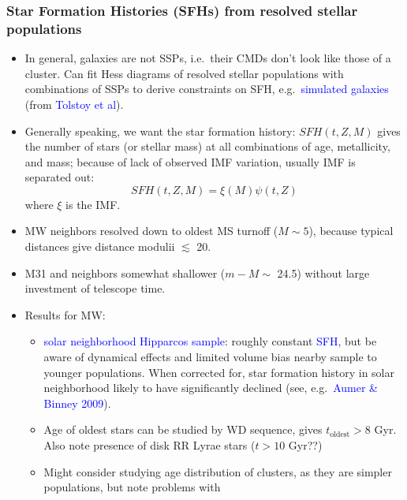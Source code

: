 \documentclass{article}
\begin{document}
\subsubsection{Star Formation Histories (SFHs) from resolved stellar populations}
      \begin{itemize}
          \item In general, galaxies are not SSPs, i.e.\ their CMDs don't look
              like those of a cluster. Can fit Hess diagrams of resolved stellar
              populations with combinations of SSPs to derive constraints on SFH,
              e.g.\ \textcolor{blue}{simulated galaxies} (from \textcolor{blue}
              {Tolstoy et al}).
          \item Generally speaking, we want the star formation history:
              $SFH(t,Z,M)$ gives the number of stars (or stellar mass) at all
              combinations of age, metallicity, and mass; because of lack of
              observed IMF variation, usually IMF is separated out:
              $$ SFH(t,Z,M) = \xi(M)\psi(t,Z) $$
              where $\xi$ is the IMF.
          \item MW neighbors resolved down to oldest MS turnoff ($M \sim 5$),
              because typical distances give distance modulii $\lesssim$ 20.
          \item M31 and neighbors somewhat shallower ($m-M\sim$ 24.5)
              without large investment of telescope time.
          \item Results for MW:
              \begin{itemize}
                  \item \textcolor{blue}{solar neighborhood Hipparcos sample}:
                      roughly constant \textcolor{blue}{SFH}, but be aware
                      of dynamical effects and limited volume bias nearby
                      sample to younger populations. When corrected for, star
                      formation history in solar neighborhood likely to have
                      significantly declined (see, e.g.\ \textcolor{blue}
                      {Aumer \& Binney 2009}).
                  \item Age of oldest stars can be studied by WD sequence,
                      gives $t_{\textrm{oldest}} > 8$ Gyr. Also note presence
                      of disk RR Lyrae stars ($t > 10$ Gyr??)
                  \item Might consider studying age distribution of clusters,
                      as they are simpler populations, but note problems with

\end{itemize}
\end{itemize}
\end{document}
